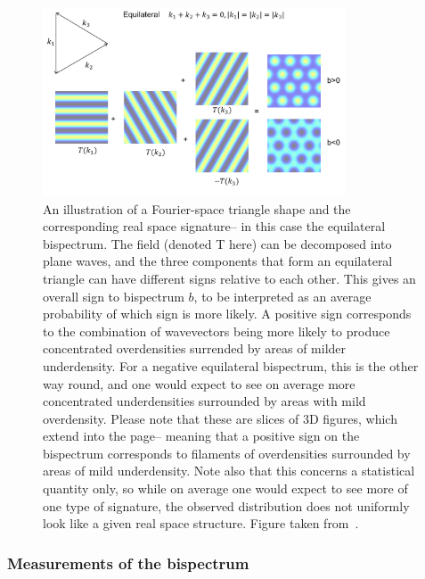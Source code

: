 \begin{figure}[!ht]
	\centering
	\includegraphics[width=0.8\textwidth]{fig/Equilateral.png}
	\caption{An illustration of a Fourier-space triangle shape and the corresponding real space signature-- in this case the equilateral bispectrum. The field (denoted T here) can be decomposed into plane waves, and the three components that form an equilateral triangle can have different signs relative to each other. This gives an overall sign to bispectrum $b$, to be interpreted as an average probability of which sign is more likely. A positive sign corresponds to the combination of wavevectors being more likely to produce concentrated overdensities surrended by areas of milder underdensity. For a negative equilateral bispectrum, this is the other way round, and one would expect to see on average more concentrated underdensities surrounded by areas with mild overdensity. Please note that these are slices of 3D figures, which extend into the page-- meaning that a positive sign on the bispectrum corresponds to filaments of overdensities surrounded by areas of mild underdensity. Note also that this concerns a statistical quantity only, so while on average one would expect to see more of one type of signature, the observed distribution does not uniformly look like a given real space structure. Figure taken from~\cite{Lewis:2011}.}
	\label{fig:realspacesignature}
\end{figure}

\subsubsection{Measurements of the bispectrum}

